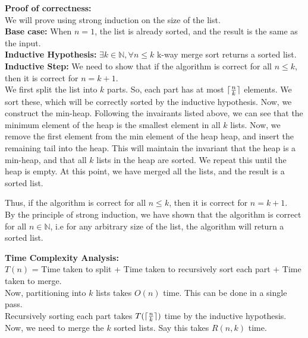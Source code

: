 \documentclass[a4paper]{article}
\DeclarePairedDelimiter{\ceil}{\lceil}{\rceil}
\begin{document}
\begin{enumerate}
    \textbf{Proof of correctness:}\\
    We will prove using strong induction on the size of the list.\\

    \textbf{Base case:} When $n = 1$, the list is already sorted, and the result is the same as the input.\\

    \textbf{Inductive Hypothesis:} $\exists k \in \mathbb{N}, \forall n \leq k$ k-way merge sort returns a sorted list.\\

    \textbf{Inductive Step:} We need to show that if the algorithm is correct for all $n \leq k$, then it is correct for $n = k+1$.\\

    We first split the list into $k$ parts. So, each part has at most $\ceil{\frac{n}{k}}$ elements. We sort these, which will be correctly sorted by the inductive hypothesis. Now, we construct the min-heap. Following the invairants listed above, we can see that the minimum element of the heap is the smallest element in all $k$ lists. Now, we remove the first element from the min element of the heap heap, and insert the remaining tail into the heap. This will maintain the invariant that the heap is a min-heap, and that all $k$ lists in the heap are sorted. We repeat this until the heap is empty. At this point, we have merged all the lists, and the result is a sorted list.

    Thus, if the algorithm is correct for all $n \leq k$, then it is correct for $n = k+1$.\\

    By the principle of strong induction, we have shown that the algorithm is correct for all $n \in \mathbb{N}$, i.e for any arbitrary size of the list, the algorithm will return a sorted list.

    \newpage

    \textbf{Time Complexity Analysis:}\\
    $T(n)$ = Time taken to split + Time taken to recursively sort each part + Time taken to merge.\\

    Now, partitioning into $k$ lists takes $O(n)$ time. This can be done in a single pass.\\
    Recursively sorting each part takes $T(\ceil{\frac{n}{k}})$ time by the inductive hypothesis.\\
    Now, we need to merge the $k$ sorted lists. Say this takes $R(n, k)$ time.\\


\end{enumerate}
\end{document}
